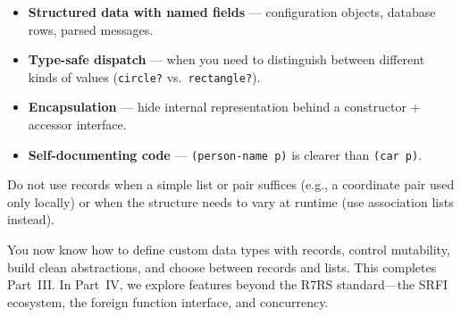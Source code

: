 \begin{itemize}
    \item \textbf{Structured data with named fields} --- configuration objects, database rows, parsed messages.
    \item \textbf{Type-safe dispatch} --- when you need to distinguish between different kinds of values (\texttt{circle?} vs.\ \texttt{rectangle?}).
    \item \textbf{Encapsulation} --- hide internal representation behind a constructor + accessor interface.
    \item \textbf{Self-documenting code} --- \texttt{(person-name p)} is clearer than \texttt{(car p)}.
\end{itemize}

Do not use records when a simple list or pair suffices (e.g., a coordinate pair used only locally) or when the structure needs to vary at runtime (use association lists instead).

\sectionbreak

You now know how to define custom data types with records, control mutability, build clean abstractions, and choose between records and lists. This completes Part~III. In Part~IV, we explore features beyond the R7RS standard---the SRFI ecosystem, the foreign function interface, and concurrency.
